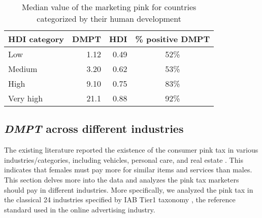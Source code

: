 \documentclass[twocolumn]{bmcart}\usepackage{lineno}
\begin{document}
\begin{center}
    \begin{table}[!t]
        \caption{Median value of the marketing pink for countries categorized by their human development
        {\label{tab:hdi_pink}}}
        \begin{adjustbox}{center}


\color{blue}
\begin{tabular}{|l|r|r|c|}
\hline
HDI category & \multicolumn{1}{l|}{DMPT} & \multicolumn{1}{l|}{HDI} & \multicolumn{1}{l|}{\% positive DMPT} \\ \hline
Low          & 1.12                    & 0.49        &    52\%          \\
Medium       & 3.20                     & 0.62        &    53\%    \\
High         & 9.10                     & 0.75         &    83\%     \\
Very high    & 21.1                    & 0.88            &    92\%   \\ \hline
\end{tabular}
\end{adjustbox}







     \end{table}
\end{center}





\subsection{\emph{DMPT} across different industries}
The existing literature reported the existence of the consumer pink tax in various industries/categories, including vehicles, personal care, and real estate \cite{guittar2022beyond,duesterhaus2011cost,morton2003consumer,busse2017repairing,goldberg1996dealer,ayres1995race,ayres1991fair,goldsmith2020gender,guittar2022beyond,investopedia2021,duesterhaus2011cost}. This indicates that females must pay more for similar items and services than males. This section delves more into the data and analyzes the pink tax marketers should pay in different industries. More specifically, we analyzed the pink tax in the classical 24 industries specified by IAB Tier1 taxonomy \cite{IABTechLab}, the reference standard used in the online advertising industry.        
\end{document}
